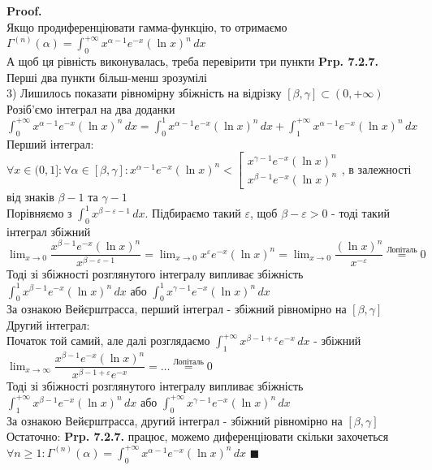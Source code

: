 \documentclass[a4paper, 14pt]{extarticle}
\def\huge{\displaystyle}
\def\bigline{\vspace{5mm}\\}
\theoremstyle{theoremdd}
\theoremstyle{theoremdd}
\theoremstyle{theoremdd}
\theoremstyle{theoremdd}
\theoremstyle{theoremdd}
\theoremstyle{theoremdd}
\theoremstyle{theoremdd}
\theoremstyle{theoremdd}
\newenvironment{pf}{\vspace*{-3mm} \textbf{Proof. \\}}{$\blacksquare$}
\begin{document}
\begin{pf}
Якщо продиференціювати гамма-функцію, то отримаємо\\
$\Gamma^{(n)}(\alpha) = \huge\int_0^{+\infty} x^{\alpha-1} e^{-x} (\ln x)^n\,dx$\\
А щоб ця рівність виконувалась, треба перевірити три пункти \textbf{Prp. 7.2.7.}\\
Перші два пункти більш-менш зрозумілі\\
3) Лишилось показати рівномірну збіжність на відрізку $[\beta, \gamma] \subset (0,+\infty)$\\
Розіб'ємо інтеграл на два доданки\\
$\huge\int_0^{+\infty} x^{\alpha-1}e^{-x} (\ln x)^n\,dx = \int_0^1 x^{\alpha-1}e^{-x} (\ln x)^n\,dx + \int_1^{+\infty} x^{\alpha-1}e^{-x} (\ln x)^n\,dx$\\
Перший інтеграл:\\
$\forall x \in (0,1]: \forall \alpha \in [\beta,\gamma]: x^{\alpha-1}e^{-x} (\ln x)^n < \left[ \begin{gathered} x^{\gamma-1}e^{-x} (\ln x)^n \\ x^{\beta-1}e^{-x} (\ln x)^n \end{gathered} \right.$, в залежності від знаків $\beta-1$ та $\gamma-1$\\
Порівняємо з $\huge\int_0^{1} x^{\beta-\varepsilon-1}\,dx$. Підбираємо такий $\varepsilon$, щоб $\beta - \varepsilon > 0$ - тоді такий інтеграл збіжний\\
$\huge\lim_{x \to 0} \dfrac{x^{\beta-1}e^{-x} (\ln x)^n}{x^{\beta-\varepsilon-1}} = \lim_{x \to 0} x^{\varepsilon} e^{-x} (\ln x)^n = \lim_{x \to 0} \dfrac{(\ln x)^n}{x^{-\varepsilon}} \overset{\text{Лопіталь}}{=} 0$\\
Тоді зі збіжності розглянутого інтегралу випливає збіжність $\huge\int_0^1 x^{\beta-1} e^{-x} (\ln x)^n\,dx$ або $\huge\int_0^1 x^{\gamma-1} e^{-x} (\ln x)^n\,dx$\\
За ознакою Вейєрштрасса, перший інтеграл - збіжний рівномірно на $[\beta,\gamma]$
\bigline
Другий інтеграл:\\
Початок той самий, але далі розглядаємо $\huge\int_1^{+\infty} x^{\beta-1+\varepsilon} e^{-x}\,dx$ - збіжний\\
$\huge\lim_{x \to \infty} \dfrac{x^{\beta-1} e^{-x} (\ln x)^n}{x^{\beta-1+\varepsilon} e^{-x}} = \dots \overset{\text{Лопіталь}}{=} 0$\\
Тоді зі збіжності розглянутого інтегралу випливає збіжність $\huge\int_1^{+\infty} x^{\beta-1} e^{-x} (\ln x)^n\,dx$ або $\huge\int_0^{+\infty} x^{\gamma-1} e^{-x} (\ln x)^n\,dx$\\
За ознакою Вейєрштрасса, другий інтеграл - збіжний рівномірно на $[\beta,\gamma]$\\
Остаточно: \textbf{Prp. 7.2.7.} працює, можемо диференціювати скільки захочеться\\
$\forall n \geq 1: \Gamma^{(n)} (\alpha) = \huge\int_0^{+\infty} x^{\alpha-1}e^{-x} ( \ln x)^n \,dx$
\end{pf}
\end{document}
